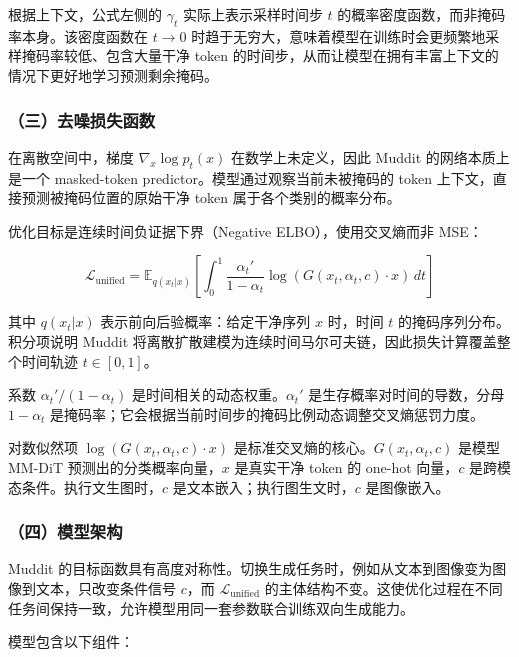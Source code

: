 根据上下文，公式左侧的 \(\gamma_t\) 实际上表示采样时间步 \(t\) 的概率密度函数，而非掩码率本身。该密度函数在 \(t\to 0\) 时趋于无穷大，意味着模型在训练时会更频繁地采样掩码率较低、包含大量干净 token 的时间步，从而让模型在拥有丰富上下文的情况下更好地学习预测剩余掩码。

\hypertarget{ux4e09ux53bbux566aux635fux5931ux51fdux6570}{%
\subsubsection{（三）去噪损失函数}\label{ux4e09ux53bbux566aux635fux5931ux51fdux6570}}

在离散空间中，梯度 \(\nabla_x\log p_t(x)\) 在数学上未定义，因此 Muddit 的网络本质上是一个 masked-token predictor。模型通过观察当前未被掩码的 token 上下文，直接预测被掩码位置的原始干净 token 属于各个类别的概率分布。

优化目标是连续时间负证据下界（Negative ELBO），使用交叉熵而非 MSE：

\[
\mathcal{L}_{\mathrm{unified}} =
\mathbb{E}_{q(x_t|x)}
\left[
\int_0^1
\frac{\alpha_t'}{1-\alpha_t}
\log\left(G(x_t,\alpha_t,c)\cdot x\right)\,dt
\right]
\]

其中 \(q(x_t|x)\) 表示前向后验概率：给定干净序列 \(x\) 时，时间 \(t\) 的掩码序列分布。积分项说明 Muddit 将离散扩散建模为连续时间马尔可夫链，因此损失计算覆盖整个时间轨迹 \(t\in[0,1]\)。

系数 \(\alpha_t'/(1-\alpha_t)\) 是时间相关的动态权重。\(\alpha_t'\) 是生存概率对时间的导数，分母 \(1-\alpha_t\) 是掩码率；它会根据当前时间步的掩码比例动态调整交叉熵惩罚力度。

对数似然项 \(\log(G(x_t,\alpha_t,c)\cdot x)\) 是标准交叉熵的核心。\(G(x_t,\alpha_t,c)\) 是模型 MM-DiT 预测出的分类概率向量，\(x\) 是真实干净 token 的 one-hot 向量，\(c\) 是跨模态条件。执行文生图时，\(c\) 是文本嵌入；执行图生文时，\(c\) 是图像嵌入。

\hypertarget{ux56dbux6a21ux578bux67b6ux6784}{%
\subsubsection{（四）模型架构}\label{ux56dbux6a21ux578bux67b6ux6784}}

Muddit 的目标函数具有高度对称性。切换生成任务时，例如从文本到图像变为图像到文本，只改变条件信号 \(c\)，而 \(\mathcal{L}_{\mathrm{unified}}\) 的主体结构不变。这使优化过程在不同任务间保持一致，允许模型用同一套参数联合训练双向生成能力。

模型包含以下组件：

